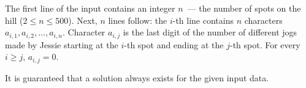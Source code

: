 The first line of the input contains an integer $n$~--- the number of spots on the hill  ($2 \le n \le 500$).
Next, $n$ lines follow: the $i$-th line contains $n$ characters $a_{i,1}, a_{i,2}, \ldots, a_{i,n}$. Character $a_{i, j}$ is the last digit of the number of different jogs made by Jessie starting at the $i$-th spot and ending at the $j$-th spot. For every $i \ge j$, $a_{i, j} = 0$.

It is guaranteed that a solution always exists for the given input data.